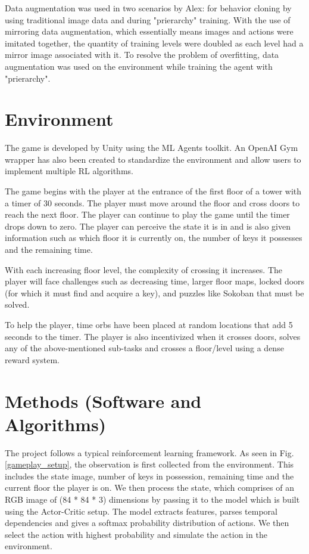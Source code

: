 \documentclass[conference]{IEEEtran}
\begin{document}
Data augmentation was used in two scenarios by Alex: for behavior cloning by using traditional image data and during "prierarchy" training. With the use of mirroring data augmentation, which essentially means images and actions were imitated together, the quantity of training levels were doubled as each level had a mirror image associated with it. To resolve the problem of overfitting, data augmentation was used on the environment while training the agent with "prierarchy". 


\section{Environment}
The game is developed by Unity using the ML Agents \cite{Unity_ml_agents_tech_blog} toolkit. An OpenAI Gym \cite{Open-ai-gym} wrapper has also been created to standardize the environment and allow users to implement multiple RL algorithms. 

The game begins with the player at the entrance of the first floor of a tower with a timer of 30 seconds. The player must move around the floor and cross doors to reach the next floor. The player can continue to play the game until the timer drops down to zero. The player can perceive the state it is in and is also given information such as which floor it is currently on, the number of keys it possesses and the remaining time. 

With each increasing floor level, the complexity of crossing it increases. The player will face challenges such as decreasing time, larger floor maps, locked doors (for which it must find and acquire a key), and puzzles like Sokoban \cite{Sokoban} that must be solved. 

To help the player, time orbs have been placed at random locations that add 5 seconds to the timer. The player is also incentivized when it crosses doors, solves any of the above-mentioned sub-tasks and crosses a floor/level using a dense reward system. 


\section{Methods (Software and Algorithms)}

The project follows a typical reinforcement learning framework. As seen in Fig. \ref{gameplay_setup}, the observation is first collected from the environment. This includes the state image, number of keys in possession, remaining time and the current floor the player is on. We then process the state, which comprises of an RGB image of (84 * 84 * 3) dimensions by passing it to the model which is built using the Actor-Critic setup. The model extracts features, parses temporal dependencies and gives a softmax probability distribution of actions. We then select the action with highest probability and simulate the action in the environment.
\end{document}
